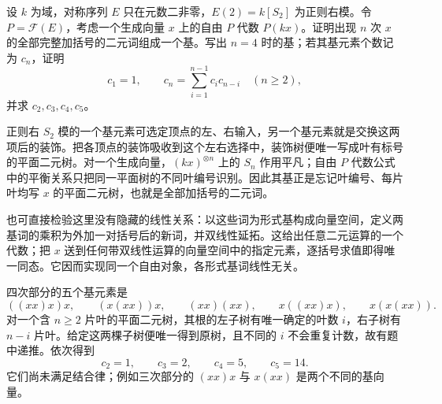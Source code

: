 \begin{exercise}\label{b4:ex:binary-free-bracketings}
	设 \(k\) 为域，对称序列 \(E\) 只在元数二非零，\(E(2)=k[S_2]\) 为正则右模。令 \(P=\mathcal F(E)\)，考虑一个生成向量 \(x\) 上的自由 \(P\) 代数 \(P(kx)\)。证明出现 \(n\) 次 \(x\) 的全部完整加括号的二元词组成一个基。写出 \(n=4\) 时的基；若其基元素个数记为 \(c_n\)，证明
	\[
		c_1=1,\qquad c_n=\sum_{i=1}^{n-1}c_i c_{n-i}\quad(n\geq2),
	\]
	并求 \(c_2,c_3,c_4,c_5\)。
\end{exercise}
\begin{solution}
	正则右 \(S_2\) 模的一个基元素可选定顶点的左、右输入，另一个基元素就是交换这两项后的装饰。把各顶点的装饰吸收到这个左右选择中，装饰树便唯一写成叶有标号的平面二元树。对一个生成向量，\((kx)^{\otimes n}\) 上的 \(S_n\) 作用平凡；自由 \(P\) 代数公式中的平衡关系只把同一平面树的不同叶编号识别。因此其基正是忘记叶编号、每片叶均写 \(x\) 的平面二元树，也就是全部加括号的二元词。

	也可直接检验这里没有隐藏的线性关系：以这些词为形式基构成向量空间，定义两基词的乘积为外加一对括号后的新词，并双线性延拓。这给出任意二元运算的一个代数；把 \(x\) 送到任何带双线性运算的向量空间中的指定元素，逐括号求值即得唯一同态。它因而实现同一个自由对象，各形式基词线性无关。

	四次部分的五个基元素是
	\[
		((xx)x)x,\qquad (x(xx))x,\qquad (xx)(xx),\qquad x((xx)x),\qquad x(x(xx)).
	\]
	对一个含 \(n\geq2\) 片叶的平面二元树，其根的左子树有唯一确定的叶数 \(i\)，右子树有 \(n-i\) 片叶。给定这两棵子树便唯一得到原树，且不同的 \(i\) 不会重复计数，故有题中递推。依次得到
	\[
		c_2=1,\qquad c_3=2,\qquad c_4=5,\qquad c_5=14.
	\]
	它们尚未满足结合律；例如三次部分的 \((xx)x\) 与 \(x(xx)\) 是两个不同的基向量。
\end{solution}

